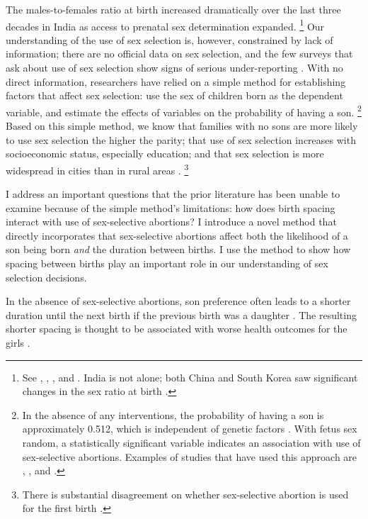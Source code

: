 \documentclass[12pt,letterpaper]{article}
\begin{document}
The males-to-females ratio at birth increased dramatically over the last three 
decades in India as access to prenatal sex determination expanded.%
\footnote{
See \citet{das_gupta97}, \citet{Sudha1999},
\citet{Arnold2002}, \cite{retherford03b} and \citet{jha06}.
India is not alone; both China and South Korea saw
significant changes in the sex ratio at birth \citep{Yi1993,park95}.
}
Our understanding of the use of sex selection is, however, constrained by 
lack of information;
there are no official data on sex selection, and the few surveys that ask about use of 
sex selection show signs of serious under-reporting \citep{goodkind96}.
With no direct information, researchers have relied on a simple method for establishing 
factors that affect sex selection: use the sex of children born as the 
dependent variable, and estimate the effects of variables on the probability of having a son.%
\footnote{
In the absence of any interventions, the probability of having a son
is approximately 0.512, which is independent of genetic factors \citep{ben-porath76b,jacobsen99}.
With fetus sex random, a statistically significant variable indicates an association with 
use of sex-selective abortions.
Examples of studies that have used this approach are \cite{retherford03b},
\cite{jha06}, and \cite{abrevaya09}. 
}
Based on this simple method, we know that families with no sons are more likely to
use sex selection the higher the parity;
that use of sex selection increases with socioeconomic status, especially education;
and that sex selection is more widespread in cities than in rural areas 
\citep{retherford03b,jha06,abrevaya09}.%
\footnote{
There is substantial disagreement on whether sex-selective abortion is used for the 
first birth \citep{retherford03b,jha06}.
}

I address an important questions that the prior literature has been unable
to examine because of the simple method's limitations:
how does birth spacing interact with use of sex-selective abortions?
I introduce a novel method that directly incorporates that sex-selective 
abortions affect both the likelihood of a son being born \emph{and} the duration between 
births.
I use the method to show how spacing between births play an important role in our 
understanding of sex selection decisions.



In the absence of sex-selective abortions, son preference often leads to a shorter duration 
until the next birth if the previous birth was a daughter  
\citep[see, for example,][]{Das1987,Rahman1993,Pong1994,Haughton1996,Arnold1997}.
The resulting shorter spacing is thought to be associated with worse health outcomes for
the girls \citep{arnold98,Whitworth2002,Rutstein2005,Conde-Agudelo2006}.
\end{document}
